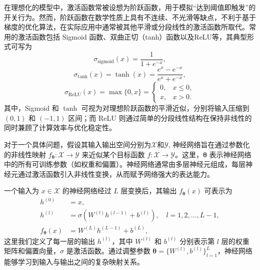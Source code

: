 在理想化的模型中，激活函数常被设想为阶跃函数，用于模拟“达到阈值即触发”的开关行为。然而，阶跃函数在数学性质上具有不连续、不光滑等缺点，不利于基于梯度的优化算法，在实际应用中通常被其他平滑或分段线性的激活函数所取代。常用的激活函数包括 Sigmoid 函数、双曲正切（tanh）函数以及ReLU等，其典型形式可写为
\begin{equation}
    \sigma_{\mathrm{sigmoid}}(x) = \frac{1}{1 + e^{-x}},
\end{equation}
\begin{equation}
    \sigma_{\tanh}(x) = \tanh(x) = \frac{e^{x} - e^{-x}}{e^{x} + e^{-x}},
\end{equation}
\begin{equation}
    \sigma_{\mathrm{ReLU}}(x)
    = \max\{0, x\}
    =
    \begin{cases}
        0, & x \le 0, \\
        x, & x > 0.
    \end{cases}
\end{equation}
其中，Sigmoid 和 $\tanh$ 可视为对理想阶跃函数的平滑近似，分别将输入压缩到 $(0,1)$ 和 $(-1,1)$ 区间；而 ReLU 则通过简单的分段线性结构在保持非线性的同时兼顾了计算效率与优化稳定性。

对于一个具体问题，假设其输入输出空间分别为$\mathcal{X}$和$\mathcal{Y}$, 神经网络旨在通过参数化的非线性映射 $f_{\bm{\theta}}: \mathcal{X} \to \mathcal{Y}$ 来近似某个目标函数 $f: \mathcal{X} \to \mathcal{Y}$。这里，$\bm{\theta}$ 表示神经网络中的所有可训练参数（如权重和偏置）。神经网络通常由多层神经元组成，每层神经元通过激活函数引入非线性变换，从而赋予网络强大的表达能力。

一个输入为 $x \in \mathcal{X}$ 的神经网络经过 $L$ 层变换后，其输出 $f_{\bm{\theta}}(x)$ 可表示为
\begin{equation}
    \begin{aligned}
        h^{(0)}            & = x,                                                                             \\
        h^{(l)}            & = \sigma\left( W^{(l)} h^{(l-1)} + b^{(l)} \right), \quad l = 1, 2, \ldots, L-1, \\
        f_{\bm{\theta}}(x) & = W^{(L)} h^{(L-1)} + b^{(L)},
    \end{aligned}
\end{equation}
这里我们定义了每一层的输出 $h^{(l)}$，其中 $W^{(l)}$ 和 $b^{(l)}$ 分别表示第 $l$ 层的权重矩阵和偏置向量，$\sigma$ 是激活函数。通过调整参数 $\bm{\theta} = \{ W^{(l)}, b^{(l)} \}_{l=1}^{L}$，神经网络能够学习到输入与输出之间的复杂映射关系。

